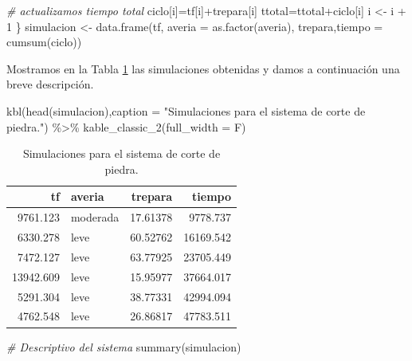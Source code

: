 \documentclass[
]{book}
\newenvironment{Shaded}{\begin{snugshade}}{\end{snugshade}}
\newcommand{\AttributeTok}[1]{\textcolor[rgb]{0.77,0.63,0.00}{#1}}
\newcommand{\CommentTok}[1]{\textcolor[rgb]{0.56,0.35,0.01}{\textit{#1}}}
\newcommand{\DecValTok}[1]{\textcolor[rgb]{0.00,0.00,0.81}{#1}}
\newcommand{\FunctionTok}[1]{\textcolor[rgb]{0.00,0.00,0.00}{#1}}
\newcommand{\NormalTok}[1]{#1}
\newcommand{\OtherTok}[1]{\textcolor[rgb]{0.56,0.35,0.01}{#1}}
\newcommand{\SpecialCharTok}[1]{\textcolor[rgb]{0.00,0.00,0.00}{#1}}
\newcommand{\StringTok}[1]{\textcolor[rgb]{0.31,0.60,0.02}{#1}}
\theoremstyle{definition}
\theoremstyle{definition}
\theoremstyle{definition}
\theoremstyle{definition}
\theoremstyle{remark}
\begin{document}
\begin{Shaded}
\begin{Highlighting}[]
  \CommentTok{\# actualizamos tiempo total}
\NormalTok{  ciclo[i]}\OtherTok{=}\NormalTok{tf[i]}\SpecialCharTok{+}\NormalTok{trepara[i]}
\NormalTok{  ttotal}\OtherTok{=}\NormalTok{ttotal}\SpecialCharTok{+}\NormalTok{ciclo[i]}
\NormalTok{  i }\OtherTok{\textless{}{-}}\NormalTok{ i }\SpecialCharTok{+} \DecValTok{1}
\NormalTok{\}}
\NormalTok{simulacion }\OtherTok{\textless{}{-}} \FunctionTok{data.frame}\NormalTok{(tf, }\AttributeTok{averia =} \FunctionTok{as.factor}\NormalTok{(averia), }
\NormalTok{                         trepara,}\AttributeTok{tiempo =} \FunctionTok{cumsum}\NormalTok{(ciclo))}
\end{Highlighting}
\end{Shaded}

Mostramos en la Tabla \ref{tab:01-054} las simulaciones obtenidas y damos a continuación una breve descripción.

\begin{Shaded}
\begin{Highlighting}[]
\FunctionTok{kbl}\NormalTok{(}\FunctionTok{head}\NormalTok{(simulacion),}\AttributeTok{caption =} \StringTok{"Simulaciones para el sistema de corte de piedra."}\NormalTok{) }\SpecialCharTok{\%\textgreater{}\%}
  \FunctionTok{kable\_classic\_2}\NormalTok{(}\AttributeTok{full\_width =}\NormalTok{ F)}
\end{Highlighting}
\end{Shaded}

\begin{table}

\caption{\label{tab:01-054}Simulaciones para el sistema de corte de piedra.}
\centering
\begin{tabular}[t]{r|l|r|r}
\hline
tf & averia & trepara & tiempo\\
\hline
9761.123 & moderada & 17.61378 & 9778.737\\
\hline
6330.278 & leve & 60.52762 & 16169.542\\
\hline
7472.127 & leve & 63.77925 & 23705.449\\
\hline
13942.609 & leve & 15.95977 & 37664.017\\
\hline
5291.304 & leve & 38.77331 & 42994.094\\
\hline
4762.548 & leve & 26.86817 & 47783.511\\
\hline
\end{tabular}
\end{table}

\begin{Shaded}
\begin{Highlighting}[]
\CommentTok{\# Descriptivo del sistema}
\FunctionTok{summary}\NormalTok{(simulacion)}
\end{Highlighting}
\end{Shaded}
\end{document}
